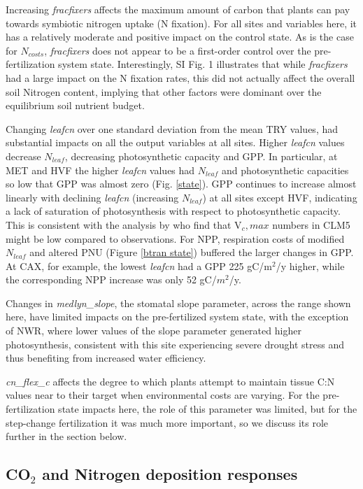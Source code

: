 \documentclass[draft,linenumbers]{agujournal}
\begin{document}
Increasing \emph{fracfixers} affects the maximum amount of carbon that plants can pay towards symbiotic nitrogen uptake (N fixation). For all sites and variables here, it has a relatively moderate and positive impact on the control state. As is the case for $N_{costs}$, \emph{fracfixers} does not appear to be a first-order control over the pre-fertilization system state. Interestingly, SI Fig. 1 illustrates that while \emph{fracfixers} had a large impact on the N fixation rates, this did not actually affect the overall soil Nitrogen content, implying that other factors were dominant over the equilibrium soil nutrient budget. 

Changing \emph{leafcn} over one standard deviation from the mean TRY values, had substantial impacts on all the output variables at all sites. Higher \emph{leafcn} values decrease $N_{leaf}$, decreasing photosynthetic capacity and GPP.  In particular, at MET and HVF the higher \emph{leafcn} values had $N_{leaf}$ and photosynthetic capacities so low that GPP was almost zero (Fig. \ref{state}).  GPP continues to increase almost linearly with declining \emph{leafcn}  (increasing $N_{leaf}$) at all sites except HVF, indicating a lack of saturation of photosynthesis with respect to photosynthetic capacity.  This is consistent with the analysis by \cite{lawrence2018} who find that V${_c,max}$ numbers in CLM5 might be low compared to observations.  For NPP, respiration costs of modified $N_{leaf}$ and altered PNU (Figure \ref{btran state}) buffered the larger changes in GPP. At CAX, for example, the lowest \emph{leafcn} had a GPP 225 gC/m$^{2}$/y higher, while the corresponding NPP increase was only 52 gC/$m^{2}$/y.

Changes in \emph{medlyn\_slope}, the stomatal slope parameter, across the range shown here, have limited impacts on the pre-fertilized system state, with the exception of NWR, where lower values of the slope parameter generated higher photosynthesis, consistent with this site experiencing severe drought stress and thus benefiting from increased water efficiency. 

\emph{cn\_flex\_c} affects the degree to which plants attempt to maintain tissue C:N values near to their target when environmental costs are varying. For the pre-fertilization state impacts here, the role of this parameter was limited, but for the step-change fertilization it was much more important, so we discuss its role further in the section below. 

\subsection{CO$_{2}$ and Nitrogen deposition responses}
\end{document}
